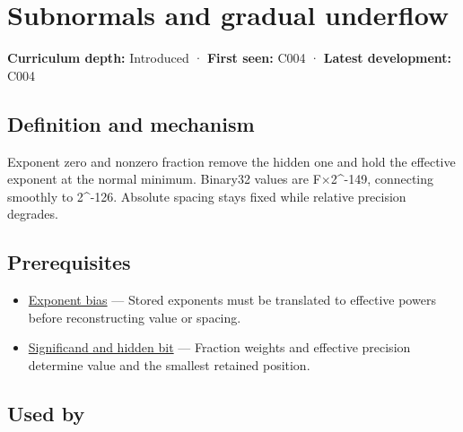 \hypertarget{appendix-00a6e044c437}{}\label{referencestart:appendix-00a6e044c437}
\section{Subnormals and gradual underflow}\label{appendix-00a6e044c437-subnormals-and-gradual-underflow}

\hypertarget{appendix-00a6e044c437-subnormals-and-gradual-underflow}{}

\textbf{Curriculum depth:} Introduced · \textbf{First seen:} C004 · \textbf{Latest development:} C004

\begin{allmightroledefinition}

\subsection{Definition and mechanism}\label{appendix-00a6e044c437-definition-and-mechanism}

\hypertarget{appendix-00a6e044c437-definition-and-mechanism}{}

Exponent zero and nonzero fraction remove the hidden one and hold the effective exponent at the normal minimum. Binary32 values are F×2\^{}-149, connecting smoothly to 2\^{}-126. Absolute spacing stays fixed while relative precision degrades.

\end{allmightroledefinition}

\subsection{Prerequisites}\label{appendix-00a6e044c437-prerequisites}

\hypertarget{appendix-00a6e044c437-prerequisites}{}

\begin{itemize}
\tightlist
\item
  \hyperref[appendix-2fae058c82e1]{Exponent bias} --- Stored exponents must be translated to effective powers before reconstructing value or spacing.
\item
  \hyperref[appendix-a24fd710cf67]{Significand and hidden bit} --- Fraction weights and effective precision determine value and the smallest retained position.
\end{itemize}

\subsection{Used by}\label{appendix-00a6e044c437-used-by}

